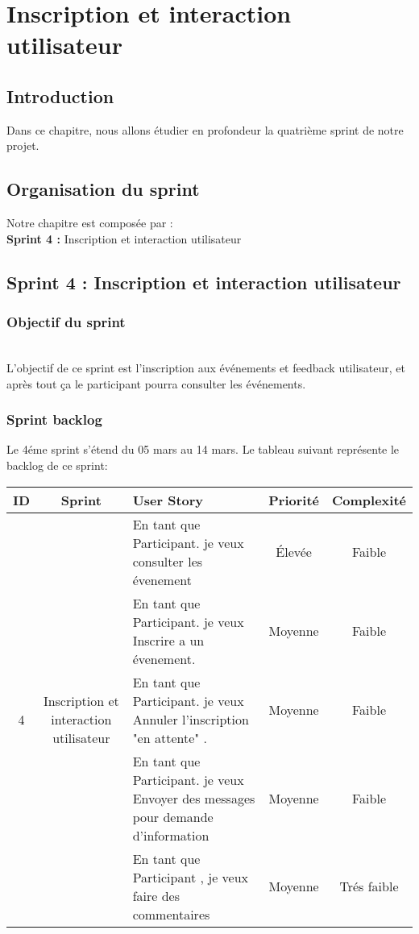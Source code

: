 \chapter{Inscription et interaction utilisateur   }

\section*{Introduction}
Dans ce chapitre, nous allons étudier en profondeur la quatrième sprint de notre projet. 
\section{Organisation du sprint}
Notre chapitre est composée par :\\
\textbf{Sprint 4 :} Inscription et interaction utilisateur
\section{Sprint 4 : Inscription et interaction utilisateur}
\subsection{Objectif du sprint}\\
L'objectif de ce sprint est l'inscription aux événements et feedback utilisateur, et après tout ça le participant pourra consulter les événements.

\subsection{Sprint backlog}
Le 4éme sprint s’étend du  05 mars au 14 mars. Le tableau suivant représente le backlog de ce sprint:
\begin{table}[h!]
\renewcommand{\arraystretch}{1.6}
\setlength{\tabcolsep}{5pt}
\centering
\begin{tabular}{|c|c|m{7cm}|c|c|}
\hline
\textbf{ID} & \textbf{Sprint} & \textbf{User Story} & \textbf{Priorité} & \textbf{Complexité} \\
\hline
\multirow{5}{*}{4} & \multirow{5}{*}{\parbox{3cm}{\centering Inscription et interaction utilisateur}}
& En tant que Participant. je veux consulter les évenement & Élevée & Faible \\
\cline{3-5}
&& En tant que Participant. je veux  Inscrire a un évenement. & Moyenne & Faible \\
\cline{3-5}
&& En tant que Participant. je veux  Annuler l'inscription "en attente" . & Moyenne & Faible \\
\cline{3-5}
&&En tant que Participant. je veux  Envoyer des messages pour demande d'information & Moyenne & Faible\\
\cline{3-5}
&& En tant que Participant , je veux faire des commentaires & Moyenne & Trés  faible \\
\hline
\end{tabular}
\end{table}
